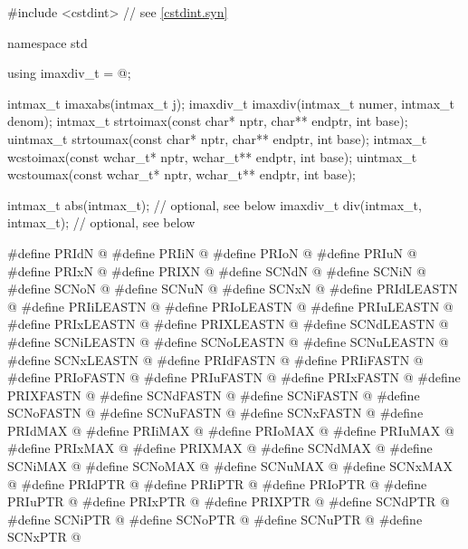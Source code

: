 \begin{codeblock}
#include <cstdint>  // see \ref{cstdint.syn}

namespace std {
  using imaxdiv_t = @\seebelow@;

  intmax_t imaxabs(intmax_t j);
  imaxdiv_t imaxdiv(intmax_t numer, intmax_t denom);
  intmax_t strtoimax(const char* nptr, char** endptr, int base);
  uintmax_t strtoumax(const char* nptr, char** endptr, int base);
  intmax_t wcstoimax(const wchar_t* nptr, wchar_t** endptr, int base);
  uintmax_t wcstoumax(const wchar_t* nptr, wchar_t** endptr, int base);

  intmax_t abs(intmax_t);               // optional, see below
  imaxdiv_t div(intmax_t, intmax_t);    // optional, see below
}

#define PRIdN @\seebelow@
#define PRIiN @\seebelow@
#define PRIoN @\seebelow@
#define PRIuN @\seebelow@
#define PRIxN @\seebelow@
#define PRIXN @\seebelow@
#define SCNdN @\seebelow@
#define SCNiN @\seebelow@
#define SCNoN @\seebelow@
#define SCNuN @\seebelow@
#define SCNxN @\seebelow@
#define PRIdLEASTN @\seebelow@
#define PRIiLEASTN @\seebelow@
#define PRIoLEASTN @\seebelow@
#define PRIuLEASTN @\seebelow@
#define PRIxLEASTN @\seebelow@
#define PRIXLEASTN @\seebelow@
#define SCNdLEASTN @\seebelow@
#define SCNiLEASTN @\seebelow@
#define SCNoLEASTN @\seebelow@
#define SCNuLEASTN @\seebelow@
#define SCNxLEASTN @\seebelow@
#define PRIdFASTN @\seebelow@
#define PRIiFASTN @\seebelow@
#define PRIoFASTN @\seebelow@
#define PRIuFASTN @\seebelow@
#define PRIxFASTN @\seebelow@
#define PRIXFASTN @\seebelow@
#define SCNdFASTN @\seebelow@
#define SCNiFASTN @\seebelow@
#define SCNoFASTN @\seebelow@
#define SCNuFASTN @\seebelow@
#define SCNxFASTN @\seebelow@
#define PRIdMAX @\seebelow@
#define PRIiMAX @\seebelow@
#define PRIoMAX @\seebelow@
#define PRIuMAX @\seebelow@
#define PRIxMAX @\seebelow@
#define PRIXMAX @\seebelow@
#define SCNdMAX @\seebelow@
#define SCNiMAX @\seebelow@
#define SCNoMAX @\seebelow@
#define SCNuMAX @\seebelow@
#define SCNxMAX @\seebelow@
#define PRIdPTR @\seebelow@
#define PRIiPTR @\seebelow@
#define PRIoPTR @\seebelow@
#define PRIuPTR @\seebelow@
#define PRIxPTR @\seebelow@
#define PRIXPTR @\seebelow@
#define SCNdPTR @\seebelow@
#define SCNiPTR @\seebelow@
#define SCNoPTR @\seebelow@
#define SCNuPTR @\seebelow@
#define SCNxPTR @\seebelow@
\end{codeblock}

